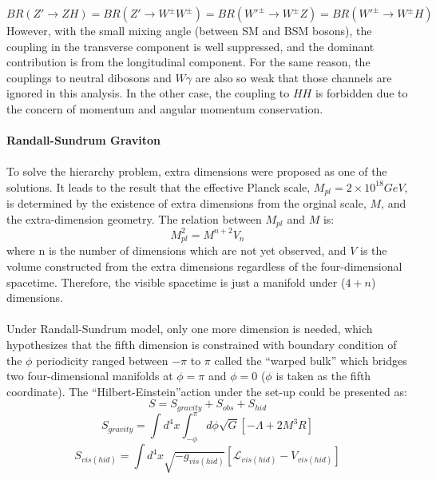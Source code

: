 \begin{equation}
BR(Z'\rightarrow ZH) = BR(Z'\rightarrow W^\pm W^\pm) = BR(W'^\pm \rightarrow W^\pm Z) = BR(W'^\pm \rightarrow W^\pm H)
\end{equation}
However, with the small mixing angle (between SM and BSM bosons), the coupling in the transverse component is well suppressed, and the dominant contribution is from the longitudinal component. For the same reason, the couplings to neutral dibosons and $W\gamma$ are also so weak that those channels are ignored in this analysis. In the other case, the coupling to $HH$ is forbidden due to the concern of momentum and angular momentum conservation. 
\\
\\{\bf Randall-Sundrum Graviton}
\\
\\To solve the hierarchy problem, extra dimensions were proposed as one of the solutions. It leads to the result that the effective Planck scale, $M_{pl}=2\times10^{18}GeV$, is determined by the existence of extra dimensions from the orginal scale, $M$, and the extra-dimension geometry. The relation between $M_{pl}$ and $M$ is: 
\begin{equation}
\label{Eq:planck_relation}
M_{pl}^{2} = M^{n+2}V_{n}
\end{equation}
where n is the number of dimensions which are not yet observed, and $V$ is the volume constructed from the extra dimensions regardless of the four-dimensional spacetime. Therefore, the visible spacetime is just a manifold under ($4+n$) dimensions.
\\ 
\\Under Randall-Sundrum model, only one more dimension is needed, which hypothesizes that the fifth dimension is constrained with boundary condition of the $\phi$ periodicity ranged between $-\pi$ to $\pi$ called the ``warped bulk'' which bridges two four-dimensional manifolds at $\phi=\pi$  and $\phi=0$ ($\phi$ is taken as the fifth coordinate). The ``Hilbert-Einstein''action under the set-up could be presented as:
\begin{equation}
S = S_{gravity} +S_{obs} + S_{hid}
\end{equation}
\begin{equation}
S_{gravity} = \int d^4x \int^{\pi}_{-\phi}d\phi\sqrt{G}\left[-\Lambda +2M^3R\right]
\end{equation}
\begin{equation}
S_{vis(hid)} = \int d^4x\sqrt{-g_{vis(hid)}}\left[\mathcal{L}_{vis(hid)}-V_{vis(hid)}\right]
\end{equation}
